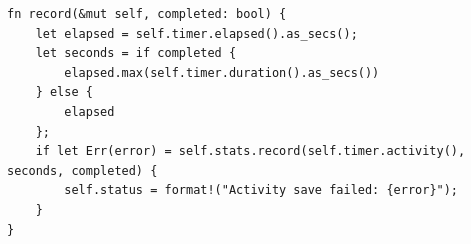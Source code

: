 \begin{lstlisting}[caption={\file{app.rs} lines 100--110. The \texttt{max} is what makes a
completed session count as a full session even if the user let it run into overtime.}]
fn record(&mut self, completed: bool) {
    let elapsed = self.timer.elapsed().as_secs();
    let seconds = if completed {
        elapsed.max(self.timer.duration().as_secs())
    } else {
        elapsed
    };
    if let Err(error) = self.stats.record(self.timer.activity(), seconds, completed) {
        self.status = format!("Activity save failed: {error}");
    }
}
\end{lstlisting}